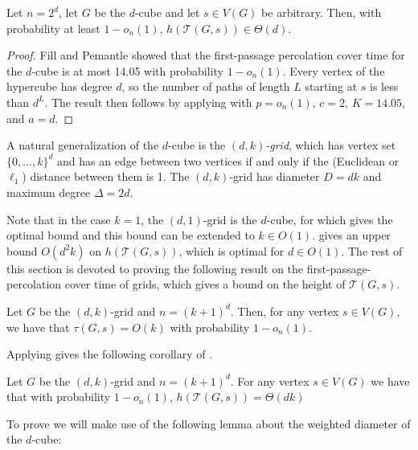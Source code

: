 \documentclass{patmorin}
\newcommand{\tcal}{\mathcal{T}}
\begin{document}
\begin{thm}
  Let $n=2^d$, let $G$ be the $d$-cube and let $s\in V(G)$ be arbitrary. Then,
  with probability at least $1-o_n(1)$, $h(\tcal(G,s))\in \Theta(d)$.
\end{thm}

\begin{proof}
  Fill and Pemantle \cite{fill.pemantle:percolation} showed that the
  first-passage percolation cover time for the $d$-cube is at most 14.05
  with probability $1-o_n(1)$.  Every vertex of the hypercube has degree
  $d$, so the number of paths of length $L$ starting at $s$ is less
  than $d^L$.  The result then follows by applying 
  with $p=o_n(1)$, $c=2$, $K=14.05$, and $a=d$.
\end{proof}

A natural generalization of the $d$-cube is the \emph{$(d,k)$-grid}, which
has vertex set $\{0,\ldots,k\}^d$ and has an edge between two vertices
if and only if the (Euclidean or $\ell_1$) distance between them is 1.
The $(d,k)$-grid has diameter $D=dk$ and maximum degree $\Delta=2d$.

Note that in the case $k=1$, the $(d,1)$-grid is the $d$-cube, for which
 gives the optimal bound and this
bound can be extended to $k\in O(1)$.   
gives an upper bound $O(d^2k)$ on $h(\tcal(G,s))$, which is optimal
for $d\in O(1)$.  The rest of this section is devoted to proving the
following result on the first-passage-percolation cover time of grids,
which gives a bound on the height of $\tcal(G,s)$.

\begin{thm}
Let $G$ be the $(d,k)$-grid and $n=(k+1)^d$.  Then, for any vertex $s\in
V(G)$, we have that $\tau(G,s)= O(k)$ with probability $1-o_n(1)$.
\end{thm}

Applying  gives the following corollary of .

\begin{cor}
Let $G$ be the $(d,k)$-grid and $n=(k+1)^d$.  For any vertex $s\in V(G)$
we have that with probability $1-o_n(1)$, $ h(\tcal(G,s)) = \Theta(dk)$
\end{cor}

To prove  we will make use of the following lemma
about the weighted diameter of the $d$-cube:
\end{document}
